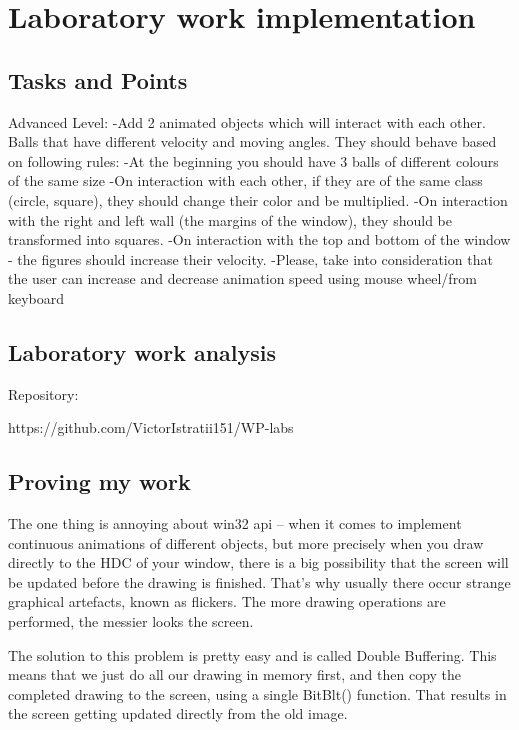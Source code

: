 \section{Laboratory work implementation}

\subsection{Tasks and Points}


Advanced Level:
	-Add 2 animated objects which will interact with each other. Balls that have different velocity and moving angles. They should behave based on following rules:
	-At the beginning you should have 3 balls of different colours of the same size
	-On interaction with each other, if they are of the same class (circle, square), they should 		change their color and be multiplied.
	-On interaction with the right and left wall (the margins of the window), they should be 			transformed into squares.
	-On interaction with the top and bottom of the window - the figures should increase their 			velocity.
	-Please, take into consideration that the user can increase and decrease animation speed using 	mouse wheel/from keyboard

\subsection{Laboratory work analysis}

Repository:

https://github.com/VictorIstratii151/WP-labs

\subsection{Proving my work}

The one thing is annoying about  win32 api -- when it comes to implement continuous animations of different objects, but more precisely when you draw directly to the HDC of your window, there is a big possibility that the screen will be updated before the drawing is finished. That's why usually there occur strange graphical artefacts, known as flickers. The more drawing operations are performed, the messier looks the screen.

The solution to this problem is pretty easy and is called Double Buffering. This means that we just do all our drawing in memory first, and then copy the completed drawing to the screen, using a single BitBlt() function. That results in the screen getting updated directly from the old image.

